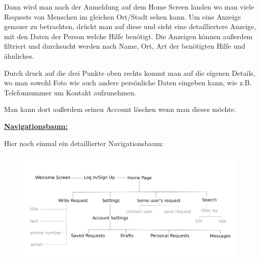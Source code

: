 \documentclass{mobileappdev}
\begin{document}
Dann wird man nach der Anmeldung auf dem Home Screen landen wo man viele Requests von Menschen im gleichen Ort/Stadt sehen kann. Um eine Anzeige genauer zu betrachten, drückt man auf diese und sieht eine detailliertere Anzeige, mit den Daten der Person welche Hilfe benötigt. Die Anzeigen können außerdem filtriert und durchsucht werden nach Name, Ort, Art der benötigten Hilfe und ähnliches.

Durch druck auf die drei Punkte oben rechts kommt man auf die eigenen Details, wo man sowohl Foto wie auch andere persönliche Daten eingeben kann, wie z.B. Telefonnummer um Kontakt aufzunehmen.

Man kann dort außerdem seinen Account löschen wenn man dieses möchte. 

\underline{\textbf{Navigationsbaum:}}

Hier noch einmal ein detaillierter Navigationsbaum:

\begin{figure}[h!]
\includegraphics[width=\linewidth]{baum.png}
\end{figure}  
\end{document}
